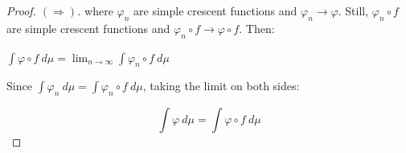 \documentclass[10pt,a4paper]{amsart}
\begin{document}
\begin{proof}[Proof. \( (\Rightarrow) \)]
\noindent where $\varphi_n$ are simple crescent functions and $\varphi_n \to \varphi$. Still, $\varphi_n \circ f$ are simple crescent functions and $\varphi_n \circ f \to \varphi \circ f$. Then:

\begin{center}
    $\displaystyle \int \varphi \circ f\ d\mu = \lim_{n \to \infty} \displaystyle \int \varphi_n \circ f\ d\mu$
\end{center}

 Since $\int \varphi_n\ d\mu = \int \varphi_n \circ f\ d\mu$, taking the limit on both sides:

\[
\displaystyle \int \varphi\ d\mu = \displaystyle \int \varphi \circ f\ d\mu 
\]
\end{proof}
\end{document}
